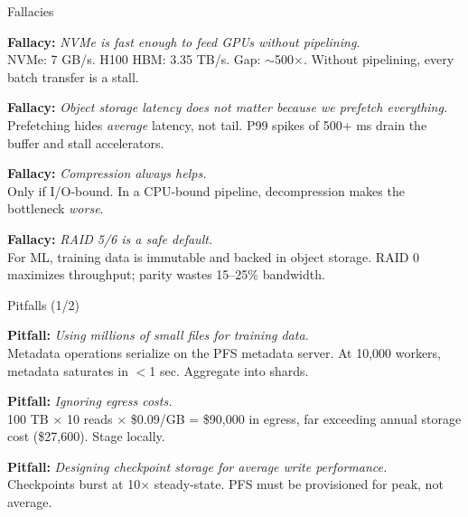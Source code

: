 \documentclass[aspectratio=169, 12pt]{beamer}
\begin{document}
\begin{frame}{Fallacies}

\small
\textbf{Fallacy:} \textit{NVMe is fast enough to feed GPUs without pipelining.}\\
{\footnotesize NVMe: 7 GB/s. H100 HBM: 3.35 TB/s. Gap: $\sim$500$\times$. Without pipelining, every batch transfer is a stall.}

\vspace{0.1cm}
\textbf{Fallacy:} \textit{Object storage latency does not matter because we prefetch everything.}\\
{\footnotesize Prefetching hides \emph{average} latency, not tail. P99 spikes of 500+ ms drain the buffer and stall accelerators.}

\vspace{0.1cm}
\textbf{Fallacy:} \textit{Compression always helps.}\\
{\footnotesize Only if I/O-bound. In a CPU-bound pipeline, decompression makes the bottleneck \emph{worse}.}

\vspace{0.1cm}
\textbf{Fallacy:} \textit{RAID 5/6 is a safe default.}\\
{\footnotesize For ML, training data is immutable and backed in object storage. RAID 0 maximizes throughput; parity wastes 15--25\% bandwidth.}

\end{frame}

\begin{frame}{Pitfalls (1/2)}

\small
\textbf{Pitfall:} \textit{Using millions of small files for training data.}\\
{\footnotesize Metadata operations serialize on the PFS metadata server. At 10,000 workers, metadata saturates in $<$1 sec. Aggregate into shards.}

\vspace{0.15cm}
\textbf{Pitfall:} \textit{Ignoring egress costs.}\\
{\footnotesize 100 TB $\times$ 10 reads $\times$ \$0.09/GB = \$90,000 in egress, far exceeding annual storage cost (\$27,600). Stage locally.}

\vspace{0.15cm}
\textbf{Pitfall:} \textit{Designing checkpoint storage for average write performance.}\\
{\footnotesize Checkpoints burst at 10$\times$ steady-state. PFS must be provisioned for peak, not average.}

\end{frame}
\end{document}
